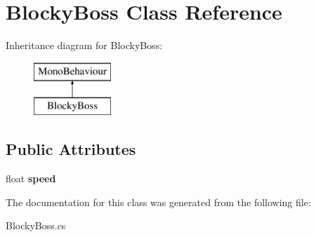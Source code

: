 \hypertarget{class_blocky_boss}{}\section{Blocky\+Boss Class Reference}
\label{class_blocky_boss}
Inheritance diagram for Blocky\+Boss\+:\begin{figure}[H]
\begin{center}
\leavevmode
\includegraphics[height=2.000000cm]{class_blocky_boss}
\end{center}
\end{figure}
\subsection*{Public Attributes}
\begin{DoxyCompactItemize}
\item 
\hypertarget{class_blocky_boss_a457e4648d6e2f54cadde4cea73295ead}{}\label{class_blocky_boss_a457e4648d6e2f54cadde4cea73295ead} 
float {\bfseries speed}
\end{DoxyCompactItemize}


The documentation for this class was generated from the following file\+:\begin{DoxyCompactItemize}
\item 
Blocky\+Boss.\+cs\end{DoxyCompactItemize}
